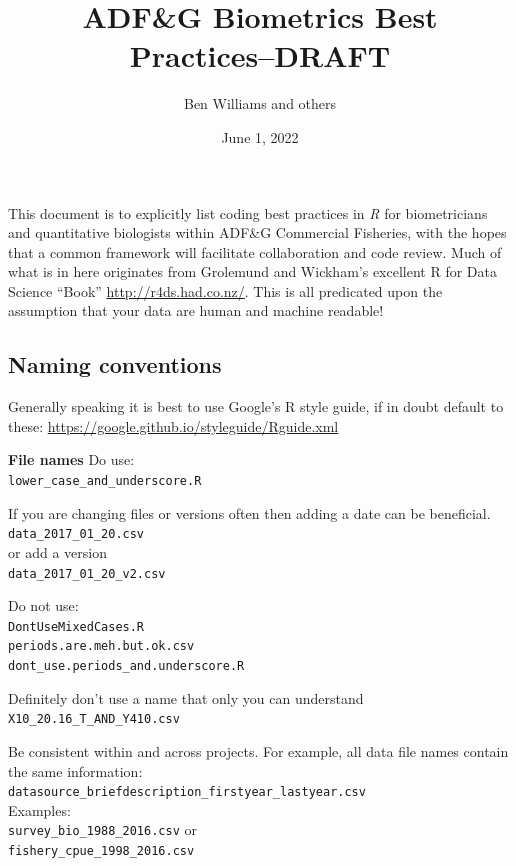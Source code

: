 \documentclass[
]{article}
\title{ADF\&G Biometrics Best Practices--DRAFT}
\author{Ben Williams and others}
\date{June 1, 2022}
\begin{document}
\maketitle

{
\setcounter{tocdepth}{2}
\tableofcontents
}
This document is to explicitly list coding best practices in \emph{R}
for biometricians and quantitative biologists within ADF\&G Commercial
Fisheries, with the hopes that a common framework will facilitate
collaboration and code review. Much of what is in here originates from
Grolemund and Wickham's excellent R for Data Science ``Book''
\url{http://r4ds.had.co.nz/}. This is all predicated upon the assumption
that your data are human and machine readable!

\hypertarget{naming-conventions}{%
\subsection{Naming conventions}\label{naming-conventions}}

Generally speaking it is best to use Google's R style guide, if in doubt
default to these: \url{https://google.github.io/styleguide/Rguide.xml}

\textbf{File names} Do use:\\
\texttt{lower\_case\_and\_underscore.R}

If you are changing files or versions often then adding a date can be
beneficial.\\
\texttt{data\_2017\_01\_20.csv}~\\
or add a version\\
\texttt{data\_2017\_01\_20\_v2.csv}

Do not use:\\
\texttt{DontUseMixedCases.R}~\\
\texttt{periods.are.meh.but.ok.csv}~\\
\texttt{dont\_use.periods\_and.underscore.R}

Definitely don't use a name that only you can understand\\
\texttt{X10\_20.16\_T\_AND\_Y410.csv}

Be consistent within and across projects. For example, all data file
names contain the same information:\\
\texttt{datasource\_briefdescription\_firstyear\_lastyear.csv}~\\
Examples:\\
\texttt{survey\_bio\_1988\_2016.csv} or\\
\texttt{fishery\_cpue\_1998\_2016.csv}
\end{document}
